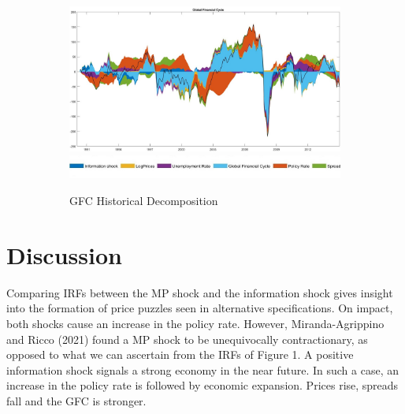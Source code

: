 \documentclass[11pt,a4paper]{article}
\begin{document}
\begin{figure}[hp]
        \vspace{0.2cm} %
        
        \begin{subfigure}{\textwidth}
            \centering
            \includegraphics[scale=.32]{Graphs/GFC_HD_3lags.jpg}
            \includegraphics*[scale=0.21]{Graphs/Inkedlegend.jpg}
            \captionsetup{font=scriptsize}
            \caption{GFC Historical Decomposition}
            \label{fig:GFChd}
        \end{subfigure}

        \caption{ }
        \label{fig:additional_elements}
    \end{figure}




\section{Discussion}


Comparing IRFs between the MP shock and the information shock gives insight into the formation of price puzzles seen in alternative specifications. 
On impact, both shocks cause an increase in the policy rate. However, Miranda-Agrippino and Ricco (2021) found a MP shock to be unequivocally contractionary, as opposed to what we can ascertain from the IRFs of Figure 1. 
A positive information shock signals a strong economy in the near future. In such a case, an increase in the policy rate is followed by economic expansion. Prices rise, spreads fall and the GFC is stronger. 
    
\end{document}
